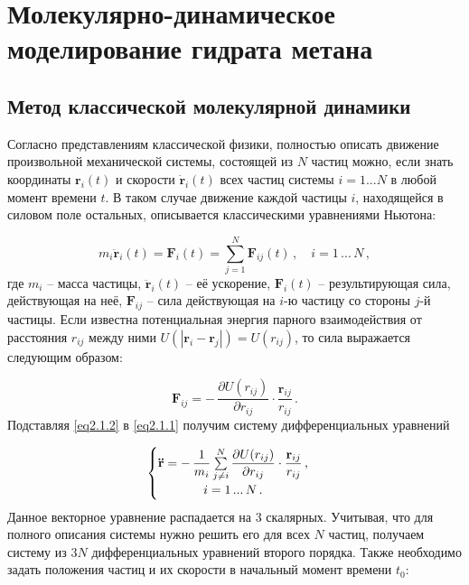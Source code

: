 \chapter{Молекулярно-динамическое моделирование гидрата метана}
\section{Метод классической молекулярной динамики}
\par Согласно представлениям классической физики, полностью описать движение произвольной механической системы, состоящей из $N$ частиц можно, если знать координаты $\mathbf{r}_i(t)$ и скорости $\mathbf{\dot{r}}_i(t)$ всех частиц системы $i=1...N$ в любой момент времени $t$. В таком случае движение каждой частицы $i$, находящейся в силовом поле остальных, описывается классическими уравнениями Ньютона:

\begin{equation}
    m_i \mathbf{\ddot{r}}_i(t) = \mathbf{F}_i(t) = \sum\limits_{j=1}^{N} \mathbf{F}_{ij}(t)\,,\quad i = 1\,...\,N \,,
    \label{eq2.1.1}
\end{equation}
где $m_i$ -- масса частицы, $\mathbf{\ddot{r}}_i(t)$ -- её ускорение, $\mathbf{F}_i(t)$ -- результирующая сила, действующая на неё, $\mathbf{F}_{ij}$ -- сила действующая на $i$-ю частицу со стороны $j$-й частицы. Если известна потенциальная энергия парного взаимодействия от расстояния $r_{ij}$ между ними $U(|\mathbf{r}_i-\mathbf{r}_j|) = U(r_{ij})$, то сила выражается следующим образом:

\begin{equation}
    \mathbf{F}_{ij} = -\,\dfrac{\partial U(r_{ij})}{\partial r_{ij}}\cdot\dfrac{\mathbf{r}_{ij}}{r_{ij}}\,.
    \label{eq2.1.2}
\end{equation}
Подставляя \eqref{eq2.1.2} в \eqref{eq2.1.1} получим систему дифференциальных уравнений

\begin{equation}
    \begin{cases}
        \mathbf{\ddot{r}} = -\,\dfrac{1}{m_i}\sum\limits_{j\neq i}^N \dfrac{\partial U(r_{ij})}{\partial r_{ij}}\cdot\dfrac{\mathbf{r}_{ij}}{r_{ij}}\,, \\
        \hfil i = 1\, ...\, N\,.
    \end{cases}
    \label{eq2.1.3}
\end{equation}
Данное векторное уравнение распадается на 3 скалярных. Учитывая, что для полного описания системы нужно решить его для всех $N$ частиц, получаем систему из $3N$ дифференциальных уравнений второго порядка. Также необходимо задать положения частиц и их скорости в начальный момент времени $t_0$:

